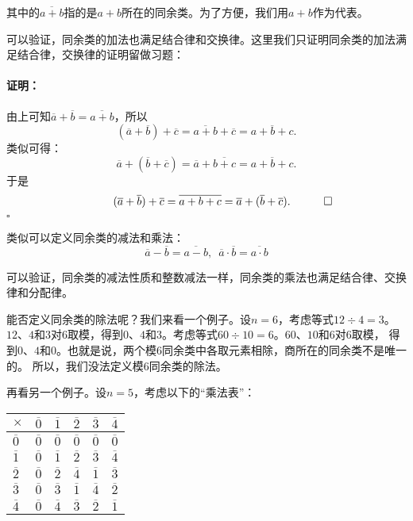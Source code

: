 \documentclass[12pt,UTF8]{ctexbook}
\renewenvironment{proof}{\paragraph{\textbf{证明：}}}{\hfill$\square$}
\begin{document}
其中的$\overline{a + b}$指的是$a+b$所在的同余类。为了方便，我们用$a + b$作为代表。

可以验证，同余类的加法也满足结合律和交换律。这里我们只证明同余类的加法满足结合律，交换律的证明留做习题：

\begin{proof}
    由上可知$ \overline{a} + \overline{b} = \overline{a + b}$，所以
    $$ (\overline{a} + \overline{b}) + \overline{c} = \overline{a + b}+ \overline{c} = \overline{a + b + c}.$$
    类似可得：
    $$ \overline{a} + (\overline{b} + \overline{c}) = \overline{a}+ \overline{b + c} = \overline{a + b + c}.$$
    于是
    $$ \quad \quad \quad (\overline{a} + \overline{b}) + \overline{c}  = \overline{a + b + c} = \overline{a} + (\overline{b} + \overline{c}). \quad \qedhere$$
\end{proof}

类似可以定义同余类的减法和乘法：
$$ \overline{a} - \overline{b} = \overline{a - b}, \,\,\, \overline{a} \cdot \overline{b} = \overline{a \cdot b}$$

可以验证，同余类的减法性质和整数减法一样，同余类的乘法也满足结合律、交换律和分配律。

能否定义同余类的除法呢？我们来看一个例子。设$n=6$，考虑等式$12 \div 4 = 3$。
$12$、$4$和$3$对$6$取模，得到$0$、$4$和$3$。考虑等式$60 \div 10 = 6$。$60$、$10$和$6$对$6$取模，
得到$0$、$4$和$0$。也就是说，两个模$6$同余类中各取元素相除，商所在的同余类不是唯一的。
所以，我们没法定义模$6$同余类的除法。

再看另一个例子。设$n=5$，考虑以下的“乘法表”：
\begin{center}
    \begin{tabular}{ | p{2em}<{\centering} | p{2em}<{\centering} | p{2em}<{\centering} | p{2em}<{\centering} | p{2em}<{\centering} | p{2em}<{\centering} | }
        \hline
            $\times$   & $\overline{0}$ & $\overline{1}$ & $\overline{2}$ & $\overline{3}$ & $\overline{4}$ \\ [0.5ex] 
        \hline
        $\overline{0}$ & $\overline{0}$ & $\overline{0}$ & $\overline{0}$ & $\overline{0}$ & $\overline{0}$ \\  
        \hline
        $\overline{1}$ & $\overline{0}$ & $\overline{1}$ & $\overline{2}$ & $\overline{3}$ & $\overline{4}$ \\
        \hline
        $\overline{2}$ & $\overline{0}$ & $\overline{2}$ & $\overline{4}$ & $\overline{1}$ & $\overline{3}$ \\
        \hline
        $\overline{3}$ & $\overline{0}$ & $\overline{3}$ & $\overline{1}$ & $\overline{4}$ & $\overline{2}$ \\
        \hline 
        $\overline{4}$ & $\overline{0}$ & $\overline{4}$ & $\overline{3}$ & $\overline{2}$ & $\overline{1}$ \\
        \hline
    \end{tabular}
\end{center}
\end{document}
